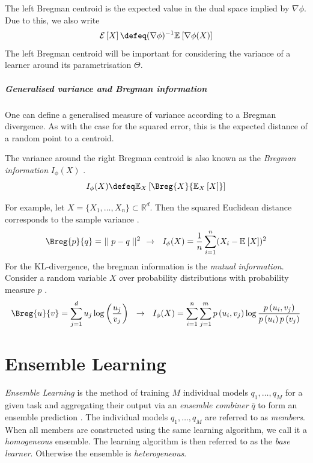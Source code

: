 \documentclass[
    a4paper, %
	fontsize=10pt, %
	twoside=false, %
]{kaobook}
\begin{document}
The left Bregman centroid is the expected value in the dual space implied by $\nabla\phi$. Due to this, we also write 
$$\mathcal{E}\left[X\right] \defeq (\nabla \phi)^{-1}\mathbb{E}_{}\left[ \nabla \phi(X) \right]$$ 
The left Bregman centroid will be important for considering the variance of a learner around its parametrisation $\Theta$.

\paragraph{Generalised variance and Bregman information}

One can define a generalised measure of variance according to a Bregman divergence. As with the case for the squared error, this is the expected distance of a random point to a centroid. 

\begin{definition}
	\label{def:bregman-information}
	The variance around the right Bregman centroid is also known as the 
	\textit{Bregman information} 
  $I_{\phi}(X)$
  \cite{banerjee_ClusteringBregmanDivergences_2004}.
$$
I_{\phi}(X) \defeq \mathbb{E}_{X}\left[ \Breg{X}{\mathbb{E}_X\left[ X \right] } \right] 
$$
\end{definition}

For example, let $X = \{ X_{1}, \dots, X_{n} \} \subset \mathbb{R}^d$. Then the squared Euclidean distance corresponds to the sample variance \cite{banerjee_ClusteringBregmanDivergences_2004}.
$$
\Breg{p}{q} =~\mid\mid p-q\mid\mid^2 ~ ~ \rightarrow ~ ~ 
I_{\phi}(X) = \frac{1}{n} \sum_{i=1}^n (X_{i} - \mathbb{E}_{}\left[ X \right] )^2
$$
For the KL-divergence, the bregman information is the \textit{mutual information}. Consider a random variable $X$ over probability distributions with probability measure $p$ \cite{banerjee_ClusteringBregmanDivergences_2004}.
$$
\Breg{u}{v} = \sum_{j=1}^d u_{j} \log \left( \frac{u_{j}}{v_{j}} \right) 
~ ~ \rightarrow ~ ~  I_{\phi}(X) = 
\sum_{i=1}^n \sum_{j=1}^m p\left(u_i, v_j\right) \log \frac{p\left(u_i, v_j\right)}{p\left(u_i\right) p\left(v_j\right)}
$$




\chapter{Ensemble Learning}
\label{chapter:ensemble-learning}

\textit{Ensemble Learning} is the method of training $M$ individual models $q_{1}, \dots, q_{M}$ for a given task and aggregating their output via an \textit{ensemble combiner} $\bar{q}$ to form an ensemble prediction \cite{zhou_EnsembleMethodsFoundations_2012}.
The individual models $q_{1}, \dots, q_{M}$ are referred to as \textit{members}. When all members are constructed using the same learning algorithm, we call it a \textit{homogeneous} ensemble. The learning algorithm is then referred to as the \textit{base learner}. Otherwise the ensemble is \textit{heterogeneous}. 
\end{document}
